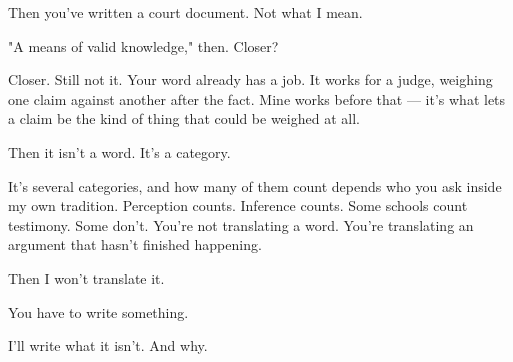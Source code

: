 \begin{dialogue}
Then you've written a court document. Not what I mean.\\
\end{dialogue}
\begin{dialogue}
"A means of valid knowledge," then. Closer?\\
\end{dialogue}
\begin{dialogue}
Closer. Still not it. Your word already has a job. It works for a judge, weighing one claim against another after the fact. Mine works before that --- it's what lets a claim be the kind of thing that could be weighed at all.\\
\end{dialogue}
\begin{dialogue}
Then it isn't a word. It's a category.\\
\end{dialogue}
\begin{dialogue}
It's several categories, and how many of them count depends who you ask inside my own tradition. Perception counts. Inference counts. Some schools count testimony. Some don't. You're not translating a word. You're translating an argument that hasn't finished happening.\\
\end{dialogue}
\begin{dialogue}
Then I won't translate it.\\
\end{dialogue}
\begin{dialogue}
You have to write something.\\
\end{dialogue}
\begin{dialogue}
I'll write what it isn't. And why.\\
\end{dialogue}
